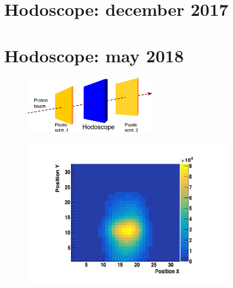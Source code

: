 \section{Hodoscope: december 2017}

\section{Hodoscope: may 2018}


\begin{figure}[!htbp]
\centering
\includegraphics[width=0.5\textwidth]{03_GraphicFiles/chapter6_BeamTests/Nice_May2018/scheme.png}
\caption{}
\label{chap6::fig::May_HodoDAQscheme}
\end{figure}

\begin{figure}[!htbp]
\centering
\includegraphics[width=0.8\textwidth]{03_GraphicFiles/chapter6_BeamTests/Nice_May2018/map2D.pdf}
\caption{}
\label{chap6::fig::May_HodoMap2D}
\end{figure}


